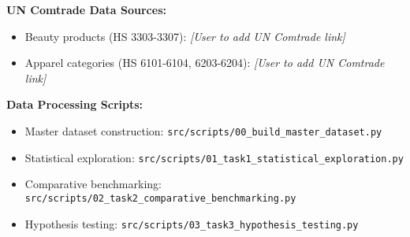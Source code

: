 \documentclass[11pt]{article}
\begin{document}
\textbf{UN Comtrade Data Sources:}
\begin{itemize}
    \item Beauty products (HS 3303-3307): \textit{[User to add UN Comtrade link]}
    \item Apparel categories (HS 6101-6104, 6203-6204): \textit{[User to add UN Comtrade link]}
\end{itemize}

\textbf{Data Processing Scripts:}
\begin{itemize}  
    \item Master dataset construction: \texttt{src/scripts/00\_build\_master\_dataset.py}
    \item Statistical exploration: \texttt{src/scripts/01\_task1\_statistical\_exploration.py}
    \item Comparative benchmarking: \texttt{src/scripts/02\_task2\_comparative\_benchmarking.py}
    \item Hypothesis testing: \texttt{src/scripts/03\_task3\_hypothesis\_testing.py}
\end{itemize}
\end{document}
